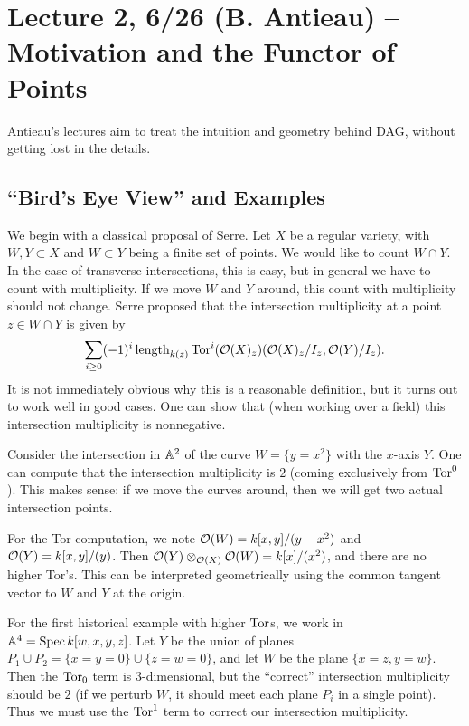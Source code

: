 \documentclass{amsart}
\begin{document}
\section{Lecture 2, 6/26 (B. Antieau) -- Motivation and the Functor of Points}

Antieau's lectures aim to treat the intuition and geometry behind DAG, without getting lost in the details.

\subsection{``Bird's Eye View'' and Examples}

We begin with a classical proposal of Serre.
Let $X$ be a regular variety, with $W, Y \subset X$ and $W \subset Y$ being a finite set of points.
We would like to count $W \cap Y$.
In the case of transverse intersections, this is easy, but in general we have to count with multiplicity.
If we move $W$ and $Y$ around, this count with multiplicity should not change.
Serre proposed that the intersection multiplicity at a point $z \in W \cap Y$ is given by
\[
\sum_{i \geq 0} (-1)^i \length_{k(z)} \Tor^i(\Oc(X)_z)(\Oc(X)_z / I_z, \Oc(Y) / I_z).
\]
It is not immediately obvious why this is a reasonable definition, but it turns out to work well in good cases.
One can show that (when working over a field) this intersection multiplicity is nonnegative.

\begin{ex}
Consider the intersection in $\AA^2$ of the curve $W = \{ y = x^2 \}$ with the $x$-axis $Y$.
One can compute that the intersection multiplicity is $2$ (coming exclusively from $\Tor^0$).
This makes sense: if we move the curves around, then we will get two actual intersection points.

For the Tor computation, we note $\Oc(W) = k[x, y] / (y - x^2)$ and $\Oc(Y) = k[x, y] / (y)$.
Then $\Oc(Y) \otimes_{\Oc(X)} \Oc(W) = k[x] / (x^2)$, and there are no higher Tor's.
This can be interpreted geometrically using the common tangent vector to $W$ and $Y$ at the origin.
\end{ex}

\begin{ex}
For the first historical example with higher $\Tor$s, we work in $\AA^4 = \Spec k[w, x, y, z]$.
Let $Y$ be the union of planes $P_1 \cup P_2 = \{ x = y = 0 \} \cup \{ z = w = 0 \}$, and let $W$ be the plane $\{ x = z, y = w\}$.
Then the $\Tor_0$ term is $3$-dimensional, but the ``correct'' intersection multiplicity should be $2$ (if we perturb $W$, it should meet each plane $P_i$ in a single point).
Thus we must use the $\Tor^1$ term to correct our intersection multiplicity.
\end{ex}
\end{document}
